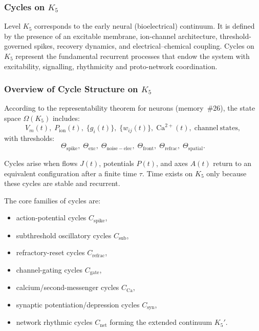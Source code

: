 
\subsubsection{Cycles on \texorpdfstring{$K_5$}{K_5}}
\label{sec:cycles-k5}

Level $K_5$ corresponds to the early neural (bioelectrical) continuum.
It is defined by the presence of an excitable membrane, ion-channel
architecture, threshold-governed spikes, recovery dynamics, and
electrical–chemical coupling.  
Cycles on $K_5$ represent the fundamental recurrent processes that endow
the system with excitability, signalling, rhythmicity and proto-network
coordination.

\subsubsection{Overview of Cycle Structure on \texorpdfstring{$K_5$}{K_5}}

According to the representability theorem for neurons (memory~\#26),
the state space $\Omega(K_5)$ includes:
\[
  V_m(t),\;
  P_{\mathrm{ion}}(t),\;
  \{g_i(t)\},\;
  \{w_{ij}(t)\},\;
  \mathrm{Ca}^{2+}(t),\;
  \mathrm{channel\ states},
\]
with thresholds:
\[
  \Theta_{\mathrm{spike}},\;
  \Theta_{\mathrm{exc}},\;
  \Theta_{\mathrm{noise-elec}},\;
  \Theta_{\mathrm{front}},\;
  \Theta_{\mathrm{refrac}},\;
  \Theta_{\mathrm{spatial}}.
\]

Cycles arise when flows $J(t)$, potentials $P(t)$, and axes $A(t)$
return to an equivalent configuration after a finite time $\tau$.
Time exists on $K_5$ only because these cycles are stable and recurrent.

The core families of cycles are:

\begin{itemize}
  \item action-potential cycles $C_{\mathrm{spike}}$,
  \item subthreshold oscillatory cycles $C_{\mathrm{sub}}$,
  \item refractory-reset cycles $C_{\mathrm{refrac}}$,
  \item channel-gating cycles $C_{\mathrm{gate}}$,
  \item calcium/second-messenger cycles $C_{\mathrm{Ca}}$,
  \item synaptic potentiation/depression cycles $C_{\mathrm{syn}}$,
  \item network rhythmic cycles $C_{\mathrm{net}}$ forming the extended continuum $K_5'$.
\end{itemize}

